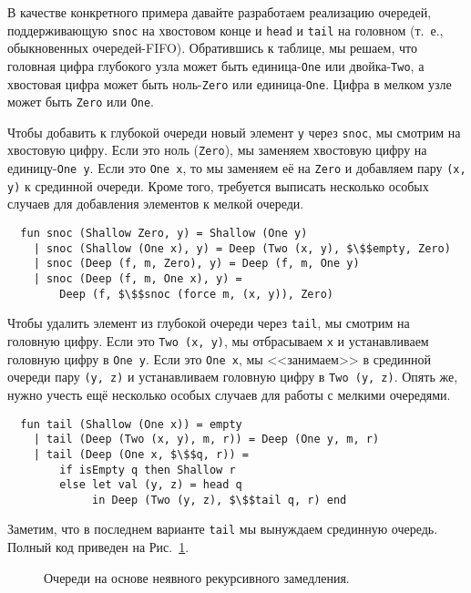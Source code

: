 В качестве конкретного примера давайте разработаем реализацию
очередей, поддерживающую \lstinline!snoc! на хвостовом конце и
\lstinline!head! и \lstinline!tail! на головном (т.~е., обыкновенных
очередей-FIFO). Обратившись к таблице, мы решаем, что головная цифра
глубокого узла может быть единица-\lstinline!One! или
двойка-\lstinline!Two!, а хвостовая цифра может быть
ноль-\lstinline!Zero! или единица-\lstinline!One!. Цифра в мелком узле
может быть \lstinline!Zero! или \lstinline!One!.

Чтобы добавить к глубокой очереди новый элемент \lstinline!y! через
\lstinline!snoc!, мы смотрим на хвостовую цифру. Если это ноль
(\lstinline!Zero!), мы заменяем хвостовую цифру на
единицу-\lstinline!One y!. Если это \lstinline!One x!, то мы заменяем её на \lstinline!Zero!
и добавляем пару \lstinline!(x, y)! к срединной очереди. Кроме того,
требуется выписать несколько особых случаев для добавления элементов к
мелкой очереди.
\begin{lstlisting}
  fun snoc (Shallow Zero, y) = Shallow (One y)
    | snoc (Shallow (One x), y) = Deep (Two (x, y), $\$$empty, Zero)
    | snoc (Deep (f, m, Zero), y) = Deep (f, m, One y)
    | snoc (Deep (f, m, One x), y) =
        Deep (f, $\$$snoc (force m, (x, y)), Zero)
\end{lstlisting}

Чтобы удалить элемент из глубокой очереди через
\lstinline!tail!, мы смотрим на головную цифру. Если это
\lstinline!Two (x, y)!, мы отбрасываем \lstinline!x! и устанавливаем
головную цифру в \lstinline!One y!. Если это \lstinline!One x!, мы
<<занимаем>> в срединной очереди пару \lstinline!(y, z)! и
устанавливаем головную цифру в \lstinline!Two (y, z)!. Опять же, нужно
учесть ещё несколько особых случаев для работы с мелкими очередями.
\begin{lstlisting}
  fun tail (Shallow (One x)) = empty
    | tail (Deep (Two (x, y), m, r)) = Deep (One y, m, r)
    | tail (Deep (One x, $\$$q, r)) =
        if isEmpty q then Shallow r
        else let val (y, z) = head q
             in Deep (Two (y, z), $\$$tail q, r) end
\end{lstlisting}
Заметим, что в последнем варианте \lstinline!tail! мы вынуждаем
срединную очередь. Полный код приведен на Рис.~\ref{fig:11.1}.

\begin{figure}
  \centering

  \caption{Очереди на основе неявного рекурсивного замедления.}
  \label{fig:11.1}
\end{figure}

